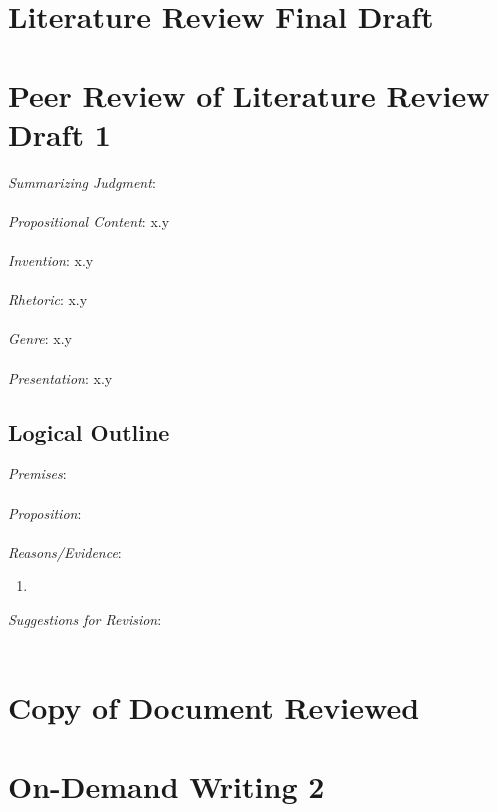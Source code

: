 \documentclass[12pt]{article}
\begin{document}
\newpage
\section{Literature Review Final Draft}

%
%

\newpage

\section{Peer Review of Literature Review Draft 1}
\noindent \textit{Summarizing Judgment}: \\ \\
\textit{Propositional Content}: x.y \\ \\ %
\textit{Invention}: x.y \\ \\
\textit{Rhetoric}: x.y \\ \\
\textit{Genre}: x.y \\ \\
\textit{Presentation}: x.y
\subsection*{Logical Outline}
\noindent \textit{Premises}: \\ \\
\textit{Proposition}: \\ \\
\textit{Reasons/Evidence}:
\begin{enumerate}
	\item \ %
\end{enumerate}
\textit{Suggestions for Revision}: \\\\


\newpage
\section{Copy of Document Reviewed}

%
%

\newpage
\section*{On-Demand Writing 2}
\end{document}
